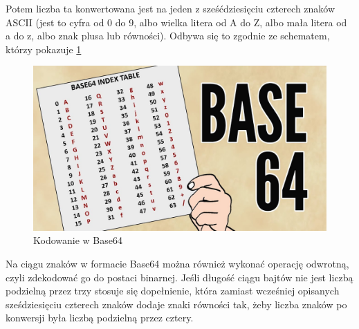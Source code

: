 Potem liczba ta konwertowana jest na jeden z sześćdziesięciu czterech znaków ASCII (jest to cyfra od 0 do 9, albo wielka litera od A do Z, albo mała litera od a do z, albo znak plusa lub równości). Odbywa się to zgodnie ze schematem, którzy pokazuje \ref{fig:Base64Coding}
\begin{figure}[H]
    \centering
    \includegraphics[width=\textwidth]{Images/Base64Coding.jpg}
    \caption{Kodowanie w Base64}
	\label{fig:Base64Coding}
\end{figure}
Na ciągu znaków w formacie Base64 można również wykonać operację odwrotną, czyli zdekodować go do postaci binarnej. Jeśli długość ciągu bajtów nie jest liczbą podzielną przez trzy stosuje się dopełnienie, która zamiast wcześniej opisanych sześdziesięciu czterech znaków dodaje znaki równości tak, żeby liczba znaków po konwersji była liczbą podzielną przez cztery.